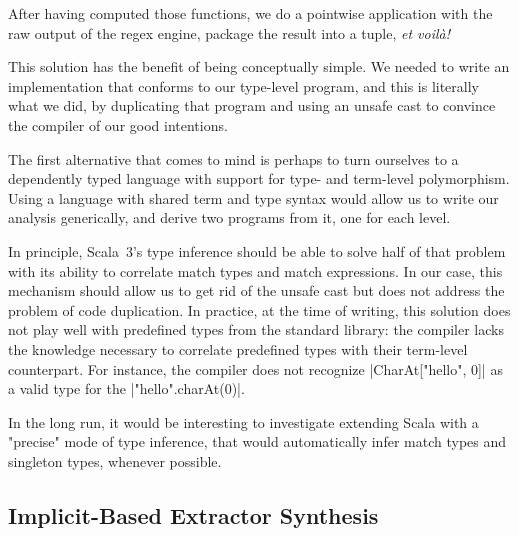 \regexTermLvlLoop

\noindent
After having computed those functions, we do a pointwise application with the raw output of the regex engine, package the result into a tuple, \emph{et voilà!}

\regexTransform

This solution has the benefit of being conceptually simple.
We needed to write an implementation that conforms to our type-level program, and this is literally what we did, by duplicating that program and using an unsafe cast to convince the compiler of our good intentions.

The first alternative that comes to mind is perhaps to turn ourselves to a dependently typed language with support for type- and term-level polymorphism.
Using a language with shared term and type syntax would allow us to write our analysis generically, and derive two programs from it, one for each level.

In principle, Scala~3's type inference should be able to solve half of that problem with its ability to correlate match types and match expressions.%
%
In our case, this mechanism should allow us to get rid of the unsafe cast but does not address the problem of code duplication.
In practice, at the time of writing, this solution does not play well with predefined types from the standard library: the compiler lacks the knowledge necessary to correlate predefined types with their term-level counterpart.
For instance, the compiler does not recognize |CharAt["hello", 0]| as a valid type for the |"hello".charAt(0)|.

In the long run, it would be interesting to investigate extending Scala with a "precise" mode of type inference, that would automatically infer match types and singleton types, whenever possible.

\subsection{Implicit-Based Extractor Synthesis}
\label{subsec:implicit-based-extractor-synthesis}

